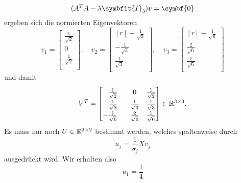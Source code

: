 \begin{example}
    \begin{equation*}
        (A^{T}A - \lambda\symbfit{I}_{3})v = \symbf{0}
    \end{equation*}
    ergeben sich die normierten Eigenvektoren
    \begin{equation*}
        \renewcommand{\arraystretch}{1.3}
        v_1 =
        \begin{bmatrix}
            \frac{1}{\sqrt{2}} \\
            0 \\
            \frac{1}{\sqrt{2}} \\
        \end{bmatrix}, \quad
        v_2 =
        \begin{bmatrix*}[r]
            -\frac{1}{\sqrt{3}} \\
            -\frac{1}{\sqrt{3}} \\
            \frac{1}{\sqrt{3}} \\
        \end{bmatrix*}, \quad
        v_3 =
        \begin{bmatrix*}[r]
            -\frac{1}{\sqrt{6}} \\
            \frac{2}{\sqrt{6}} \\
            \frac{1}{\sqrt{6}} \\
        \end{bmatrix*}
    \end{equation*} 
    und damit
    \begin{equation*}
        \renewcommand{\arraystretch}{1.3}
        V^{T} =
        \begin{bmatrix}
            \phantom{-}\frac{1}{\sqrt{2}} & \phantom{-}0 & \frac{1}{\sqrt{2}} \\
            -\frac{1}{\sqrt{3}} & -\frac{1}{\sqrt{3}} & \frac{1}{\sqrt{3}} \\
            -\frac{1}{\sqrt{6}} & \phantom{-}\frac{2}{\sqrt{6}} & \frac{1}{\sqrt{6}} \\
        \end{bmatrix} \in \R^{3 \times 3}.
    \end{equation*}
    \enlargethispage{\baselineskip}%
    Es muss nur noch \(U \in \mathbb{R}^{2 \times 2}\) bestimmt werden, welches spaltenweise durch
    \begin{equation*}
        u_j = \frac{1}{\sigma_j}Xv_j 
    \end{equation*}
    ausgedrückt wird.
    Wir erhalten also
    \begin{equation*}
        u_1 = \frac{1}{4}

\end{equation*}
\end{example}
